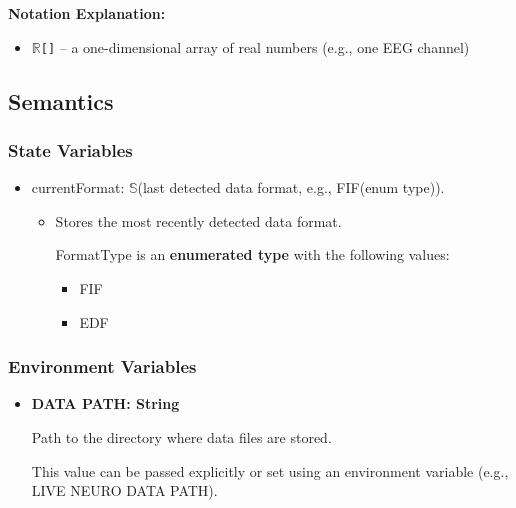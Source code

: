 \documentclass[12pt, titlepage]{article}
\begin{document}
\textbf{Notation Explanation:}


\begin{itemize}


 \item \texttt{$\mathbb{R}$[]} – a one-dimensional array of real numbers (e.g., one EEG channel)


\end{itemize}



\subsection{Semantics}

\subsubsection{State Variables}

\begin{itemize}
\item currentFormat: $\mathbb{S}$(last detected data format, e.g., FIF(enum type)).



\begin{itemize}
\item
Stores the most recently detected data format.


FormatType is an \textbf{enumerated type} with the following values:




\begin{itemize}
\item
FIF



\item
EDF



\end{itemize}




\end{itemize}





\end{itemize}


\subsubsection{Environment Variables}




\begin{itemize}
\item
\textbf{DATA PATH: String}\textbf{}


Path to the directory where data files are stored.


This value can be passed explicitly or set using an environment variable (e.g., LIVE NEURO DATA PATH).



\end{itemize}
\end{document}
